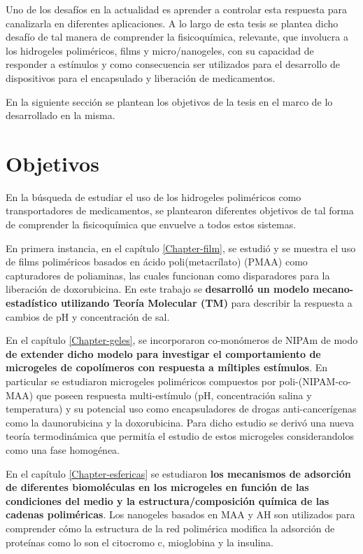 Uno de los desaf\'ios en la actualidad es aprender a controlar esta respuesta para canalizarla en diferentes aplicaciones. A lo largo de esta tesis se plantea dicho desaf\'io de tal manera de comprender la fisicoqu\'imica, relevante,  que involucra a los hidrogeles polim\'ericos, films y micro/nanogeles, con su capacidad de responder a est\'imulos y como consecuencia ser utilizados para el desarrollo de dispositivos para el encapsulado y liberaci\'on de medicamentos.

En la siguiente secci\'on se plantean los objetivos de la tesis en el marco de lo desarrollado en la misma.


\section{Objetivos}

En la b\'usqueda de estudiar el uso de los hidrogeles polim\'ericos como transportadores de medicamentos, se plantearon diferentes objetivos de tal forma de comprender la fisicoqu\'imica que envuelve a todos estos sistemas.

En primera instancia, en el cap\'itulo \ref{Chapter-film}, se estudi\'o y se muestra el uso de films polim\'ericos basados en \'acido poli(metacr\'ilato) (PMAA) como capturadores de poliaminas, las cuales funcionan como disparadores para la liberaci\'on de doxorubicina. En este trabajo se \textbf{desarroll\'o un modelo mecano-estad\'istico utilizando Teor\'ia Molecular (TM)} para describir la respuesta a cambios de pH y concentraci\'on de sal.

En el cap\'itulo \ref{Chapter-geles}, se incorporaron co-mon\'omeros de NIPAm de modo \textbf{de extender dicho modelo para investigar el comportamiento de microgeles de copol\'imeros con respuesta a m\'iltiples est\'imulos}. En particular se estudiaron microgeles polim\'ericos compuestos por poli-(NIPAM-co-MAA) que poseen respuesta multi-est\'imulo (pH, concentraci\'on salina y temperatura) y su potencial uso como encapsuladores de drogas anti-cancer\'igenas como la daunorubicina y la doxorubicina.
Para dicho estudio se deriv\'o una nueva teor\'ia termodin\'amica que permit\'ia el estudio de estos microgeles considerandolos como una fase homog\'enea.

En el cap\'itulo \ref{Chapter-esfericas} se estudiaron \textbf{los mecanismos de adsorci\'on de diferentes biomol\'eculas en los microgeles en funci\'on de las condiciones del medio y la estructura/composici\'on qu\'imica de las cadenas polim\'ericas}. Los nanogeles basados en MAA y AH son utilizados para comprender c\'omo la estructura de la red polim\'erica modifica la adsorci\'on de prote\'inas como lo son el citocromo c, mioglobina y la insulina.

